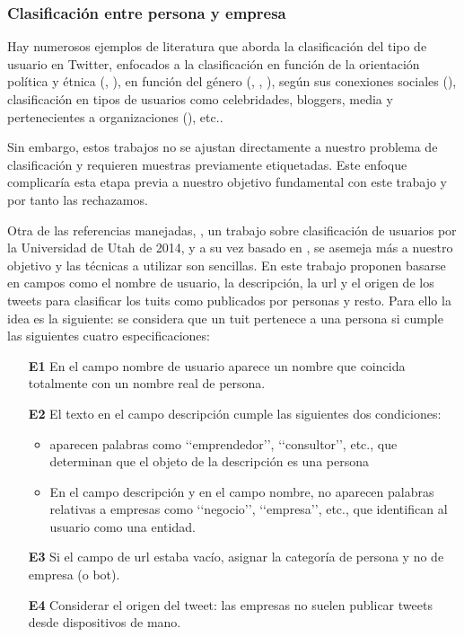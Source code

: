 \subsubsection{Clasificación entre persona y empresa}

Hay numerosos ejemplos de literatura que aborda la clasificación del tipo de usuario en Twitter, 
enfocados a la clasificación en función de la orientación política y étnica (\cite{user_class1},
\cite{user_class8}),  en función del género (\cite{user_class9}, \cite{user_class10}, 
\cite{user_class11}), según sus conexiones sociales (\cite{user_class12}), clasificación en
tipos de usuarios como celebridades, bloggers, media y pertenecientes a organizaciones 
(\cite{user_class12}), etc.. 

Sin embargo, estos trabajos no se ajustan directamente a nuestro problema de clasificación y  
requieren muestras previamente etiquetadas. Este enfoque complicaría esta etapa previa a 
nuestro objetivo fundamental con este trabajo y por tanto las rechazamos. 

Otra de las
referencias manejadas, \cite{user_class}, un trabajo sobre clasificación de usuarios
por la Universidad de Utah de 2014, y a su vez basado en \cite{user_class7}, se asemeja
más a nuestro objetivo y las técnicas a utilizar son sencillas.
En este trabajo proponen basarse en campos como el nombre de usuario, 
la descripción, la url y el origen de los tweets para clasificar los tuits como publicados por personas 
y resto. Para ello la idea es la siguiente: se considera que un tuit pertenece a una persona si 
cumple las siguientes cuatro especificaciones:
\begin{itemize}
\item[{\bf E1}] En el campo nombre de usuario aparece un nombre que coincida totalmente con 
un nombre real de persona. 
\item[{\bf E2}]El texto en el campo descripción cumple las siguientes dos condiciones:
\begin{itemize}
\item aparecen palabras como \lq\lq emprendedor\rq\rq, \lq\lq consultor\rq\rq, etc.,
que determinan que el objeto de la descripción es una persona
\item En el campo descripción y en el campo nombre, no aparecen palabras relativas a empresas como 
\lq\lq negocio\rq\rq, \lq\lq empresa\rq\rq, etc., que identifican al usuario como una entidad.
\end{itemize}
\item[{\bf E3}] Si el campo de url estaba vacío, asignar la categoría de persona y no de empresa (o bot).
\item[{\bf E4}] Considerar el origen del tweet: las empresas no suelen publicar tweets desde dispositivos de mano. 
\end{itemize}

